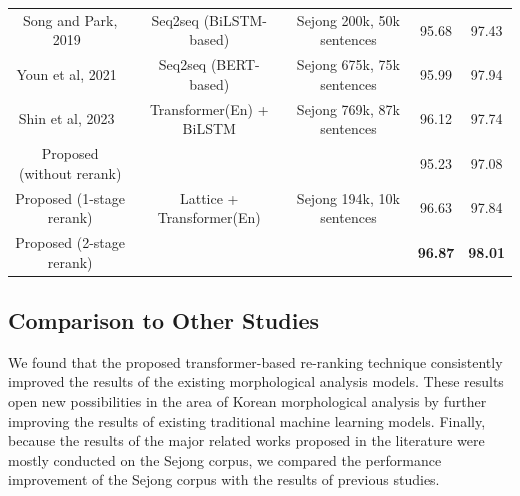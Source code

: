 \documentclass[AMS,STIX2COL]{WileyNJD-v2}
\begin{document}
\begin{table}[]
\begin{tabular*}{500pt}{@{\extracolsep\fill}ccc|cc@{\extracolsep\fill}}
            Song and Park, 2019~\cite{SongHJ2019} & Seq2seq (BiLSTM-based)                     & Sejong 200k, 50k sentences                  & 95.68                      & 97.43                        \\
            Youn et al, 2021~\cite{YounJY2021}    & Seq2seq (BERT-based)                       & Sejong 675k, 75k sentences                  & 95.99                      & 97.94                        \\
            Shin et al, 2023~\cite{ShinHJ2023}    & Transformer(En) + BiLSTM                   & Sejong 769k, 87k sentences                  & 96.12                      & 97.74                        \\
            \midrule
            Proposed (without rerank)             & \multirow{3}{*}{Lattice + Transformer(En)} & \multirow{3}{*}{Sejong 194k, 10k sentences} & 95.23                      & 97.08                        \\
            Proposed (1-stage rerank)             & ~                                          & ~                                           & 96.63                      & 97.84                        \\
            Proposed (2-stage rerank)             & ~                                          & ~                                           & \textbf{96.87}             & \textbf{98.01}               \\
            \bottomrule
        \end{tabular*}
    \end{table}

    \subsection{Comparison to Other Studies}\label{subsec5.5}

    We found that the proposed transformer-based re-ranking technique consistently improved the results of the existing morphological analysis models. These results open new possibilities in the area of Korean morphological analysis by further improving the results of existing traditional machine learning models.
    Finally, because the results of the major related works proposed in the literature were mostly conducted on the Sejong corpus, we compared the performance improvement of the Sejong corpus with the results of previous studies.
\end{document}

